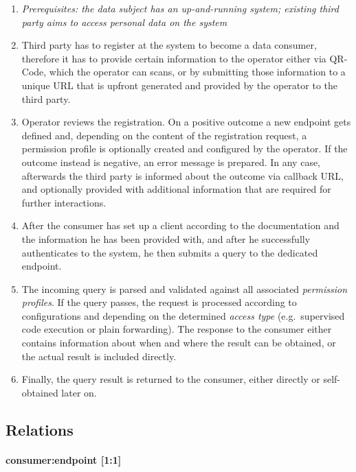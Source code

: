 \documentclass[12pt,english,a4paper,titlepage,cleardoublepage=empty,dottedtoc]{report}
\begin{document}
\begin{enumerate}
\def\labelenumi{\arabic{enumi}.}
\setcounter{enumi}{-1}
\item
  \emph{Prerequisites: the data subject has an up-and-running system;
  existing third party aims to access personal data on the system}
\item
  Third party has to register at the system to become a data consumer,
  therefore it has to provide certain information to the operator either
  via QR-Code, which the operator can scans, or by submitting those
  information to a unique URL that is upfront generated and provided by
  the operator to the third party.
\item
  Operator reviews the registration. On a positive outcome a new
  endpoint gets defined and, depending on the content of the
  registration request, a permission profile is optionally created and
  configured by the operator. If the outcome instead is negative, an
  error message is prepared. In any case, afterwards the third party is
  informed about the outcome via callback URL, and optionally provided
  with additional information that are required for further
  interactions.
\item
  After the consumer has set up a client according to the documentation
  and the information he has been provided with, and after he
  successfully authenticates to the system, he then submits a query to
  the dedicated endpoint.
\item
  The incoming query is parsed and validated against all associated
  \emph{permission profiles}. If the query passes, the request is
  processed according to configurations and depending on the determined
  \emph{access type} (e.g.~supervised code execution or plain
  forwarding). The response to the consumer either contains information
  about when and where the result can be obtained, or the actual result
  is included directly.
\item
  Finally, the query result is returned to the consumer, either directly
  or self-obtained later on.
\end{enumerate}

\subsection{Relations}\label{relations}

\paragraph{consumer:endpoint {[}1:1{]}}\label{consumerendpoint-11}
\end{document}
